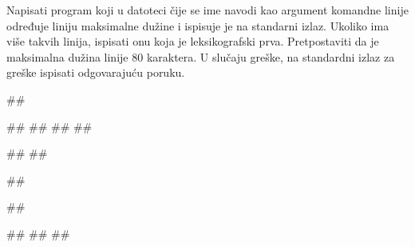 \begin{Exercise}[label=v3_02] 
Napisati program koji u datoteci čije se ime navodi kao argument komandne 
linije određuje liniju maksimalne dužine i ispisuje je na standarni izlaz. 
Ukoliko ima više takvih linija, ispisati onu koja je leksikografski prva. 
Pretpostaviti da je maksimalna dužina linije $80$ karaktera.
U slučaju greške, na standardni izlaz za greške ispisati odgovarajuću poruku.

\begin{miditest}
\begin{upotreba}{1}
##

##
##
##
##

#\naslovIzlaz#
##
\end{upotreba}
\end{miditest}
\begin{minitest}
\begin{upotreba}{2}
##

##

#\naslovIzlazZaGresku#
##
##
\end{upotreba}
\end{minitest}

\end{Exercise}
\begin{Answer}[ref=v3_02]
\end{Answer}


